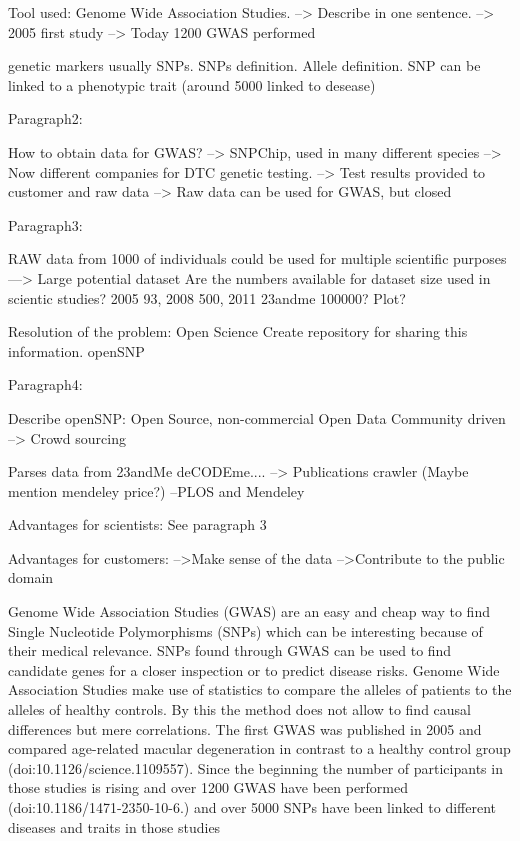 \documentclass[10pt]{article}
\begin{document}
Tool used: Genome Wide Association Studies.
--> Describe in one sentence.
--> 2005 first study
--> Today 1200 GWAS performed

genetic markers usually SNPs.
SNPs definition. Allele definition.
SNP can be linked to a phenotypic trait (around 5000 linked to desease)
 
Paragraph2:

How to obtain data for GWAS?
--> SNPChip, used in many different species
--> Now different companies for DTC genetic testing.
--> Test results provided to customer and raw data
--> Raw data can be used for GWAS, but closed



Paragraph3:

RAW data from 1000 of individuals could be used for multiple scientific
purposes
---> Large potential dataset Are the numbers available for dataset size used
in scientic studies? 2005 93, 2008 500, 2011 23andme 100000? Plot?

Resolution of the problem: Open Science
Create repository for sharing this information. openSNP


Paragraph4:

Describe openSNP:
Open Source, non-commercial
Open Data
Community driven --> Crowd sourcing


Parses data from 23andMe deCODEme....
--> Publications crawler (Maybe mention mendeley price?)
        --PLOS and Mendeley

Advantages for scientists: See paragraph 3

Advantages for customers: 
-->Make sense of the data
-->Contribute to the public domain



Genome Wide Association Studies (GWAS) are an easy and cheap way to find Single Nucleotide Polymorphisms (SNPs) which can be interesting because of their medical relevance. SNPs found through GWAS can be used to find candidate genes for a closer inspection or to predict disease risks. Genome Wide Association Studies make use of statistics to compare the alleles of patients to the alleles of healthy controls. By this the method does not allow to find causal differences but mere correlations. The first GWAS was published in 2005 and compared age-related macular degeneration in contrast to a healthy control group (doi:10.1126/science.1109557). Since the beginning the number of participants in those studies is rising and over 1200 GWAS have been performed (doi:10.1186/1471-2350-10-6.) and over 5000 SNPs have been linked to different diseases and traits in those studies %
\end{document}
